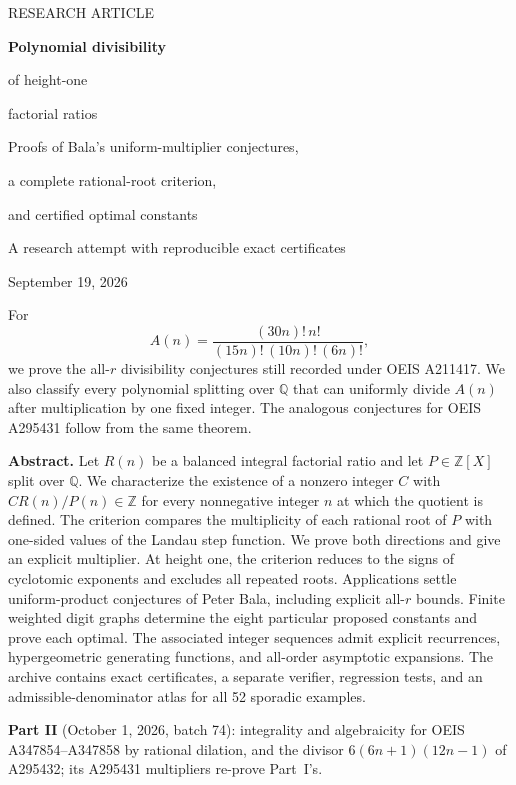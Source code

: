 \documentclass[11pt]{article}
\theoremstyle{definition}
\theoremstyle{remark}
\newcommand{\Z}{\mathbb Z}
\newcommand{\Q}{\mathbb Q}
\begin{document}
\hypersetup{pageanchor=false}
\begin{titlepage}
\vspace*{0.5cm}
{\color{accent}\large RESEARCH ARTICLE\par}
\vspace{0.6cm}
{\color{ink}\Huge\bfseries Polynomial divisibility\par of height-one\par factorial ratios\par}
\vspace{0.6cm}
{\Large Proofs of Bala's uniform-multiplier conjectures,\par
 a complete rational-root criterion,\par and certified optimal constants\par}
\vspace{0.5cm}
{\large A research attempt with reproducible exact certificates\par}
{\large September 19, 2026\par}
\vspace{0.5cm}
\begin{tcolorbox}[title=Main outcome,fonttitle=\bfseries]
For
\[
 A(n)=\frac{(30n)!\,n!}{(15n)!\,(10n)!\,(6n)!},
\]
we prove the all-$r$ divisibility conjectures still recorded under OEIS
A211417. We also classify every polynomial splitting over $\Q$ that can
uniformly divide $A(n)$ after multiplication by one fixed integer.
The analogous conjectures for OEIS A295431 follow from the same theorem.
\end{tcolorbox}
\vspace{0.4cm}
\noindent\textbf{Abstract.}
Let $R(n)$ be a balanced integral factorial ratio and let $P\in\Z[X]$
split over $\Q$. We characterize the existence of a nonzero integer $C$
with $CR(n)/P(n)\in\Z$ for every nonnegative integer $n$ at which the
quotient is defined. The criterion compares the multiplicity of each
rational root of $P$ with one-sided values of the Landau step function.
We prove both directions and give an explicit multiplier. At height one,
the criterion reduces to the signs of cyclotomic exponents and excludes
all repeated roots. Applications settle uniform-product conjectures of
Peter Bala, including explicit all-$r$ bounds. Finite weighted digit
graphs determine the eight particular proposed constants and prove each
optimal. The associated integer sequences admit explicit recurrences,
hypergeometric generating functions, and all-order asymptotic expansions.
The archive contains exact certificates, a separate verifier, regression
tests, and an admissible-denominator atlas for all 52 sporadic examples.

{\small\noindent\textbf{Part II} (October 1, 2026, batch 74): integrality and
algebraicity for OEIS A347854--A347858 by rational dilation, and the divisor
$6(6n+1)(12n-1)$ of A295432; its A295431 multipliers re-prove Part~I's.\par}
\vfill
\end{titlepage}
\hypersetup{pageanchor=true}
\end{document}
